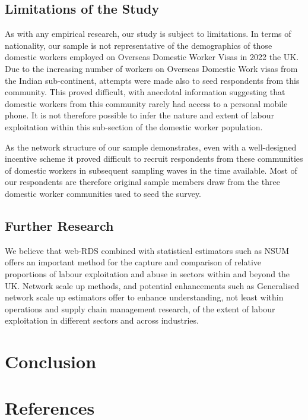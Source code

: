\documentclass[
  12pt,
  letterpaper,
  DIV=11,
  numbers=noendperiod]{scrartcl}
\theoremstyle{plain}
\theoremstyle{definition}
\begin{document}
\subsection{Limitations of the Study}\label{limitations-of-the-study}

As with any empirical research, our study is subject to limitations. In
terms of nationality, our sample is not representative of the
demographics of those domestic workers employed on Overseas Domestic
Worker Visas in 2022 the UK. Due to the increasing number of workers on
Overseas Domestic Work visas from the Indian sub-continent, attempts
were made also to seed respondents from this community. This proved
difficult, with anecdotal information suggesting that domestic workers
from this community rarely had access to a personal mobile phone. It is
not therefore possible to infer the nature and extent of labour
exploitation within this sub-section of the domestic worker population.

As the network structure of our sample demonstrates, even with a
well-designed incentive scheme it proved difficult to recruit
respondents from these communities of domestic workers in subsequent
sampling waves in the time available. Most of our respondents are
therefore original sample members draw from the three domestic worker
communities used to seed the survey.

\subsection{Further Research}\label{further-research}

We believe that web-RDS combined with statistical estimators such as
NSUM offers an important method for the capture and comparison of
relative proportions of labour exploitation and abuse in sectors within
and beyond the UK. Network scale up methods, and potential enhancements
such as Generalised network scale up estimators offer to enhance
understanding, not least within operations and supply chain management
research, of the extent of labour exploitation in different sectors and
across industries.

\section{Conclusion}\label{conclusion}

\newpage

\newpage

\section{References}\label{references}
\end{document}

